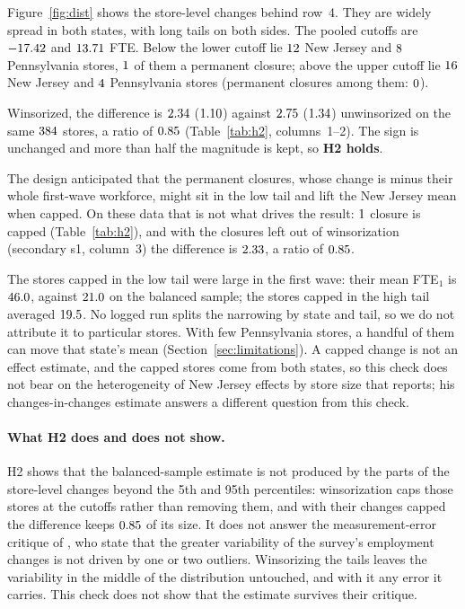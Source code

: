 \documentclass[11pt]{article}
\begin{document}
Figure~\ref{fig:dist} shows the store-level changes behind row~4. They are widely spread in
both states, with long tails on both sides. The pooled cutoffs are $-17.42$ and
$13.71$ FTE. Below the lower cutoff lie $12$ New Jersey and
$8$ Pennsylvania stores, $1$ of them a permanent closure; above the upper cutoff lie $16$ New Jersey and
$4$ Pennsylvania stores (permanent closures among them:
$0$).

Winsorized, the difference is $2.34$ ($1.10$) against
$2.75$ ($1.34$) unwinsorized on the same $384$ stores, a
ratio of $0.85$ (Table~\ref{tab:h2}, columns~1--2). The sign is unchanged and more than
half the magnitude is kept, so \textbf{H2 holds}.

The design anticipated that the permanent closures, whose change is minus their whole
first-wave workforce, might sit in the low tail and lift the New Jersey mean when capped.
On these data that is not what drives the result: $1$ closure is capped
(Table~\ref{tab:h2}), and with the closures left out of winsorization (secondary s1, column~3) the
difference is $2.33$, a ratio of $0.85$.

The stores capped in the low tail were large in the first wave: their mean FTE$_1$ is
$46.0$, against $21.0$ on the balanced sample; the stores capped in
the high tail averaged $19.5$. No logged run splits the narrowing by state
and tail, so we do not attribute it to particular stores. With few Pennsylvania stores, a
handful of them can move that state's mean (Section~\ref{sec:limitations}). A capped change
is not an effect estimate, and the capped stores come from both states, so this check does
not bear on the heterogeneity of New Jersey effects by store size that
\citet{ropponen2010cic} reports; his changes-in-changes estimate answers a different question
from this check.

\paragraph{What H2 does and does not show.} H2 shows that the balanced-sample estimate is
not produced by the parts of the store-level changes beyond the 5th and 95th percentiles:
winsorization caps those stores at the cutoffs rather than removing them, and with their
changes capped the difference keeps $0.85$ of its size. It does not answer the measurement-error critique of
\citet{neumark1995payroll}, who state that the greater variability of the survey's
employment changes is not driven by one or two outliers. Winsorizing the tails leaves the
variability in the middle of the distribution untouched, and with it any error it
carries. This check does not show that the
estimate survives their critique.
\end{document}
